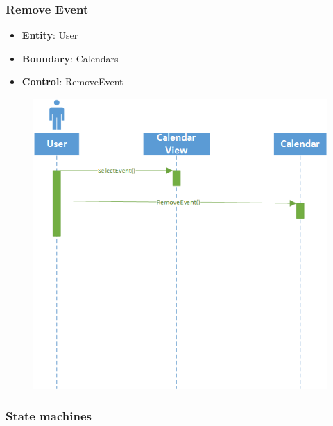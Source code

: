 \subsubsection{Remove Event}
\begin{itemize}
\item \textbf{Entity}: User
\item \textbf{Boundary}: Calendars
\item \textbf{Control}: RemoveEvent
\end{itemize}

\begin{figure}[h]
\includegraphics[scale=0.8]{removeevent.png}
\end{figure}

\clearpage
\subsubsection{State machines}
